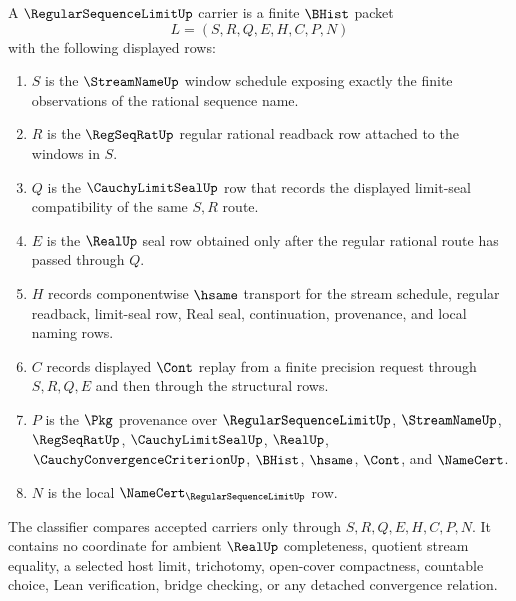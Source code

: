 \begin{definition}
\label{def:regular-sequence-limit-carrier}
A $\RegularSequenceLimitUp$ carrier is a finite $\BHist$ packet
$$
L=(S,R,Q,E,H,C,P,N)
$$
with the following displayed rows:
\begin{enumerate}
\item $S$ is the $\StreamNameUp$ window schedule exposing exactly the finite observations of the rational sequence name.
\item $R$ is the $\RegSeqRatUp$ regular rational readback row attached to the windows in $S$.
\item $Q$ is the $\CauchyLimitSealUp$ row that records the displayed limit-seal compatibility of the same $S,R$ route.
\item $E$ is the $\RealUp$ seal row obtained only after the regular rational route has passed through $Q$.
\item $H$ records componentwise $\hsame$ transport for the stream schedule, regular readback, limit-seal row, Real seal, continuation, provenance, and local naming rows.
\item $C$ records displayed $\Cont$ replay from a finite precision request through $S,R,Q,E$ and then through the structural rows.
\item $P$ is the $\Pkg$ provenance over $\RegularSequenceLimitUp$, $\StreamNameUp$, $\RegSeqRatUp$, $\CauchyLimitSealUp$, $\RealUp$, $\CauchyConvergenceCriterionUp$, $\BHist$, $\hsame$, $\Cont$, and $\NameCert$.
\item $N$ is the local $\NameCert_{\RegularSequenceLimitUp}$ row.
\end{enumerate}
The classifier compares accepted carriers only through $S,R,Q,E,H,C,P,N$. It contains no coordinate for ambient $\RealUp$ completeness, quotient stream equality, a selected host limit, trichotomy, open-cover compactness, countable choice, Lean verification, bridge checking, or any detached convergence relation.
\end{definition}

